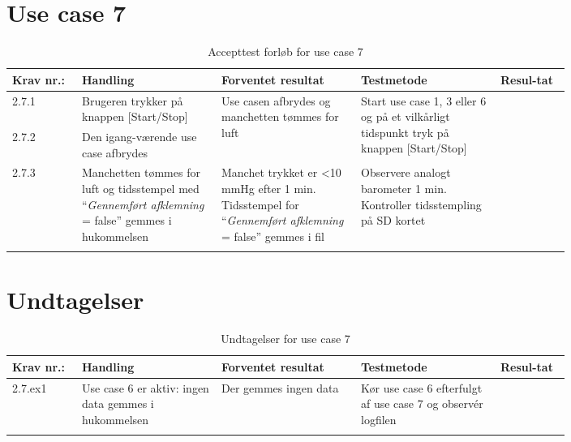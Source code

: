 \section{Use case 7}
						\begin{longtable}{|p{0.1\linewidth}|p{0.2\linewidth}|p{0.2\linewidth}|p{0.2\linewidth}|p{0.1\linewidth}|}
							\hline
							\rowcolor{usDef}
							Krav nr.: & Handling & Forventet resultat & Testmetode & Resul-tat  \\\hline
							2.7.1 & Brugeren trykker på knappen [Start/Stop] & \multirow{2}{\linewidth}{Use casen afbrydes og manchetten tømmes for luft} & \multirow{2}{\linewidth}{Start use case 1, 3 eller 6 og på et vilkårligt tidspunkt tryk på knappen [Start/Stop]} & \multirow{2}{\linewidth}{} \\ \cline{1-2}
							2.7.2 & Den igang-værende use case afbrydes & & & \\ \hline
							2.7.3 & Manchetten tømmes for luft og tidsstempel med “\textit{Gennemført afklemning} = false” gemmes i hukommelsen & Manchet trykket er \textless 10 mmHg efter 1 min. Tidsstempel for  “\textit{Gennemført afklemning} = false” gemmes i fil & Observere analogt barometer 1 min.
							Kontroller tidsstempling på SD kortet & \\ \hline
							\caption{Accepttest forløb for use case 7}
						\end{longtable}
					
					\section*{Undtagelser}
						\begin{longtable}{|p{0.1\linewidth}|p{0.2\linewidth}|p{0.2\linewidth}|p{0.2\linewidth}|p{0.1\linewidth}|}
							\hline
							\rowcolor{usDef}
							Krav nr.: & Handling & Forventet resultat & Testmetode & Resul-tat  \\\hline
							2.7.ex1 & Use case 6 er aktiv: ingen data gemmes i hukommelsen & Der gemmes ingen data & Kør use case 6 efterfulgt af use case 7 og observér logfilen & \\ \hline
							\caption{Undtagelser for use case 7}
						\end{longtable}